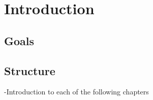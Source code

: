 \chapter{Introduction}

\section{Goals}

\section{Structure}

-Introduction to each of the following chapters